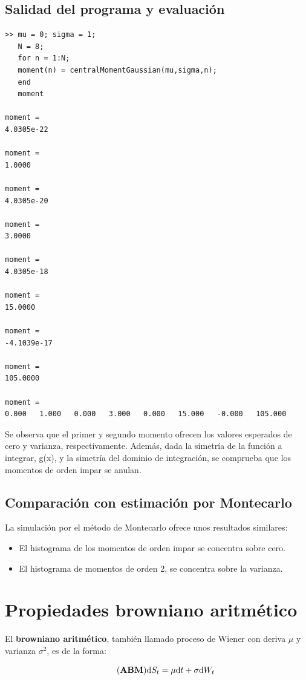 \documentclass[a4paper,11pt]{article}
\begin{document}
\subsection{Salidad del programa y evaluaci\'on}

\begin{lstlisting}
>> mu = 0; sigma = 1;
   N = 8;
   for n = 1:N;
   moment(n) = centralMomentGaussian(mu,sigma,n);
   end
   moment

moment =
4.0305e-22

moment =
1.0000

moment =
4.0305e-20

moment =
3.0000

moment =
4.0305e-18

moment =
15.0000

moment =
-4.1039e-17

moment =
105.0000

moment =
0.000   1.000   0.000   3.000   0.000   15.000   -0.000   105.000
\end{lstlisting}

Se observa que el primer y segundo momento ofrecen los valores esperados de cero y
varianza, respectivamente. Adem\'as, dada la simetr\'ia de la funci\'on a
integrar, g(x), y la simetr\'ia del dominio de integraci\'on, se comprueba que
los momentos de orden impar se anulan.

\subsection{Comparaci\'on con estimaci\'on por Montecarlo}
La simulaci\'on por el m\'etodo de Montecarlo ofrece unos resultados similares:
\begin{itemize}
   \item El histograma de los momentos de orden impar se concentra sobre cero.
   \item El histograma de momentos de orden 2, se concentra sobre la varianza.
\end{itemize}

\pagebreak
\section{Propiedades browniano aritm\'etico}
El \textbf{browniano aritm\'etico}, tambi\'en llamado proceso de Wiener con deriva $\mu$ y
varianza $\sigma^2$, es de la forma:

\begin{equation*}
   \tag{\textbf{ABM}}
   \mathrm{d}S_t = \mu\mathrm{d}t + \sigma\mathrm{d}W_t
\end{equation*}
\end{document}
